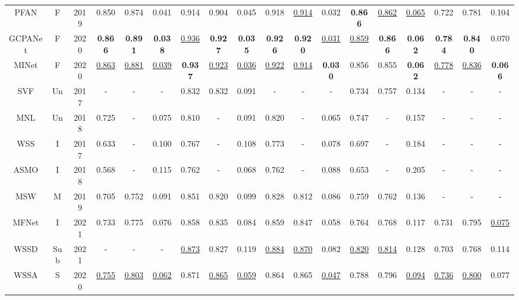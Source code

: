 \documentclass[journal]{IEEEtran}
\begin{document}
\begin{table*}[!t]
{\begin{tabular}{ccc|ccc|ccc|ccc|ccc|ccc}
PFAN    & F  & 2019       & 0.850    & 0.874    & 0.041 & 0.914    & 0.904    & 0.045 & 0.918    & \underline{0.914}    & 0.032 & \textbf{0.866}     & \underline{0.862}    & \underline{0.065} & 0.722     &  0.781     &  0.104 \\
GCPANet & F  & 2020       & \textbf{0.866}    & \textbf{0.891}    & \textbf{0.038} & \underline{0.936}    & \textbf{0.927}    &  \textbf{0.035} & \textbf{0.926}    &  \textbf{0.920}     &  \underline{0.031} & \underline{0.859}     &  \textbf{0.866}    &  \textbf{0.062} & \textbf{0.784}     & \textbf{0.840}     & 0.070 \\
MINet   & F  & 2020       & \underline{0.863}    & \underline{0.881}    & \underline{0.039}  &  \textbf{0.937}    & \underline{0.923}    & \underline{0.036} &  \underline{0.922}    & \underline{0.914}    & \textbf{0.030} &  0.856     & 0.855    & \textbf{0.062} &  \underline{0.778}      & \underline{0.836}     & \textbf{0.066}  \\ \hline
SVF     & Un  & 2017      & -        & -        & -     & 0.832    & 0.832    & 0.091 & -        & -        & -     & 0.734       & 0.757    & 0.134 & -     & -     & - \\
MNL     & Un  & 2018      & 0.725    & -        & 0.075 & 0.810     & -        & 0.091 & 0.820     & -        & 0.065 & 0.747     & -        & 0.157 & -     & -         & - \\
WSS     & I  & 2017       & 0.633    & -        & 0.100   & 0.767    & -        & 0.108 & 0.773    & -        & 0.078 & 0.697     & -        & 0.184 & -     & -         & -  \\
ASMO    & I   & 2018      & 0.568    & -        & 0.115 & 0.762    & -        & 0.068 & 0.762    & -        & 0.088 & 0.653     & -        & 0.205 & -     & -         & - \\
MSW     & M   & 2019      & 0.705    & 0.752    & 0.091 & 0.851     & 0.820    & 0.099 & 0.828    & 0.812    & 0.086 & 0.759     & 0.762    & 0.136 & -     & -     & - \\
MFNet     & I   & 2021      & 0.733    & 0.775    & 0.076 & 0.858     & 0.835    & 0.084 & 0.859    & 0.847    & 0.058 & 0.764     &0.768    & 0.117 & 0.731     & 0.795     & \underline{0.075} \\
WSSD     & Sub   & 2021      & -    & -    & - &\underline{0.873}     & 0.827    & 0.119 & \underline{0.884}    & \underline{0.870}    & 0.082 & \underline{0.820}    &\underline{0.814}    & 0.128 & 0.703     & 0.768     & 0.114 \\
WSSA    & S   & 2020      & \underline{0.755}    & \underline{0.803}    & \underline{0.062} &  0.871     & \underline{0.865}    &  \underline{0.059} & 0.864     & 0.865    & \underline{0.047} & 0.788     & 0.796    & \underline{0.094} &  \underline{0.736}     &  \underline{0.800}      &  0.077 \\

\end{tabular}}
\end{table*}
\end{document}
